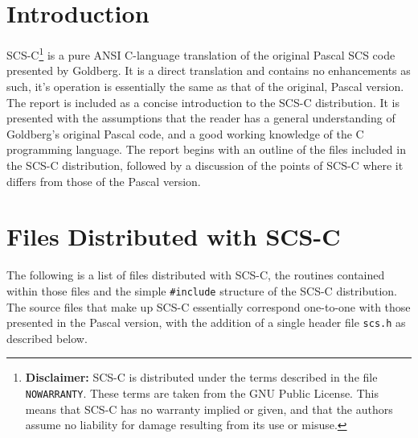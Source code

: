 
\setcounter{page}{1}

\textheight=8in

\section{Introduction}

  SCS-C\footnote{{\bf Disclaimer:} SCS-C is distributed
under the terms described in the file
\verb!NOWARRANTY!. These terms are taken from the GNU
Public License. This means that SCS-C has no warranty
implied or given, and that the authors assume no
liability for damage resulting from its use or misuse.}
is a pure ANSI C-language translation of the original Pascal 
SCS code presented by Goldberg\cite{1}. It is a direct
translation and contains no enhancements as such, it's
operation is essentially the same as that of the
original, Pascal version. The report is included as a
concise introduction to the SCS-C distribution. It is
presented with the assumptions that the reader has a
general understanding of Goldberg's original Pascal
code, and a good working knowledge of the C
programming language. The report begins with an outline
of the files included in the SCS-C distribution,
followed by a discussion of the points of SCS-C where
it differs from those of the Pascal version.  
 

\section{Files Distributed with SCS-C}

  The following is a list of files distributed with
SCS-C, the routines contained within those files and
the simple \verb!#include! structure of the SCS-C
distribution. The source files that make up SCS-C essentially
correspond one-to-one with those presented in the Pascal
version, with the addition of a single header file
\verb!scs.h! as described below.

